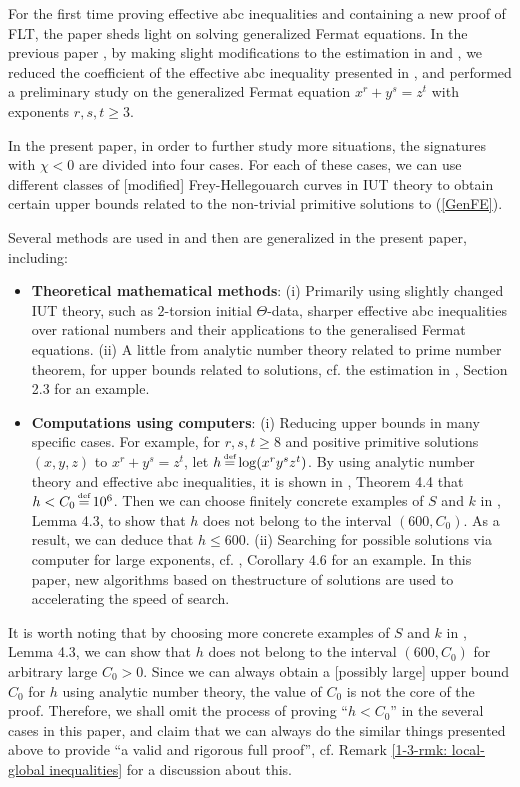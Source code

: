 \documentclass[a4paper, 12pt]{article}
\DeclareMathOperator{\defeq}{\overset{\text{\tiny{def}}}{=}}
\numberwithin{equation}{section}
\theoremstyle{definition}
\begin{document}
For the first time proving effective abc inequalities and containing a new proof of FLT, the paper \cite{ExpEst} sheds light on solving generalized Fermat equations. In the previous paper \cite{Diophantine_after_IUT_I}, by making slight modifications to the estimation in \cite{IUTchIV} and \cite{ExpEst}, we reduced the coefficient of the effective abc inequality presented in \cite{ExpEst}, and performed a preliminary study on the generalized Fermat equation $x^r + y^s = z^t$ with exponents $r, s, t \ge 3$.

In the present paper, in order to further study more situations, the signatures with $\chi < 0$ are divided into four cases. For each of these cases, we can use different classes of [modified] Frey-Hellegouarch curves in IUT theory to obtain certain upper bounds related to the non-trivial primitive solutions to (\ref{GenFE}).

Several methods are used in \cite{Diophantine_after_IUT_I} and then are generalized in the present paper, including:
\begin{itemize}
\item \textbf{Theoretical mathematical methods}:
(i) Primarily using slightly changed IUT theory, such as $2$-torsion initial $\Theta$-data, sharper effective abc inequalities over rational numbers and their applications to the generalised Fermat equations.
(ii) A little from analytic number theory related to prime number theorem, for upper bounds related to solutions, cf. the estimation in \cite{Diophantine_after_IUT_I}, Section 2.3 for an example.
\item \textbf{Computations using computers}: (i) Reducing upper bounds in many specific cases. 
For example, for $r,s,t \ge 8$ and positive primitive solutions $(x,y,z)$ to $x^r + y^s = z^t$, let $h \defeq \log(x^r y^s z^t)$. 
By using analytic number theory and effective abc inequalities, it is shown in \cite{Diophantine_after_IUT_I}, Theorem 4.4 that  $h < C_0 \defeq 10^6$. Then we can choose finitely concrete examples of $S$ and $k$ in \cite{Diophantine_after_IUT_I}, Lemma 4.3, to show that $h$ does not belong to the interval $(600, C_0)$. As a result, we can deduce that $h \le 600$. (ii) Searching for possible solutions via computer for large exponents, cf. \cite{Diophantine_after_IUT_I}, Corollary 4.6 for an example. In this paper, new algorithms based on thestructure of solutions are used to accelerating the speed of search.
\end{itemize}

It is worth noting that by choosing more concrete examples of $S$ and $k$ in \cite{Diophantine_after_IUT_I}, Lemma 4.3, we can show that $h$ does not belong to the interval $(600, C_0)$ for arbitrary large $C_0 > 0$. Since we can always obtain a [possibly large] upper bound $C_0$ for $h$ using analytic number theory, the value of $C_0$ is not the core of the proof. Therefore, we shall omit the process of proving ``$h < C_0$'' in the several cases in this paper, and claim that we can always do the similar things presented above to provide ``a valid and rigorous full proof”, cf. Remark \ref{1-3-rmk:  local-global inequalities} for a discussion about this.
\end{document}
